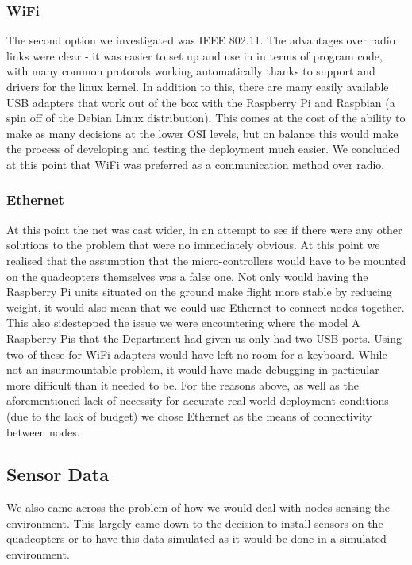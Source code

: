 \subsubsection{WiFi}
The second option we investigated was IEEE 802.11. The advantages over radio links were clear - it was easier to set up and use in in terms of program code, with many common protocols working automatically thanks to support and drivers for the linux kernel. In addition to this, there are many easily available USB adapters that work out of the box with the Raspberry Pi and Raspbian (a spin off of the Debian Linux distribution). This comes at the cost of the ability to make as many decisions at the lower OSI levels, but on balance this would make the process of developing and testing the deployment much easier. We concluded at this point that WiFi was preferred as a communication method over radio.

\subsubsection{Ethernet}
At this point the net was cast wider, in an attempt to see if there were any other solutions to the problem that were no immediately obvious. At this point we realised that the assumption that the micro-controllers would have to be mounted on the quadcopters themselves was a false one. Not only would having the Raspberry Pi units situated on the ground make flight more stable by reducing weight, it would also mean that we could use Ethernet to connect nodes together. This also sidestepped the issue we were encountering where the model A Raspberry Pis that the Department had given us only had two USB ports. Using two of these for WiFi adapters would have left no room for a keyboard. While not an insurmountable problem, it would have made debugging in particular more difficult than it needed to be. For the reasons above, as well as the aforementioned lack of necessity for accurate real world deployment conditions (due to the lack of budget) we chose Ethernet as the means of connectivity between nodes.

\subsection{Sensor Data}
We also came across the problem of how we would deal with nodes sensing the environment. This largely came down to the decision to install sensors on the quadcopters or to have this data simulated as it would be done in a simulated environment. 

